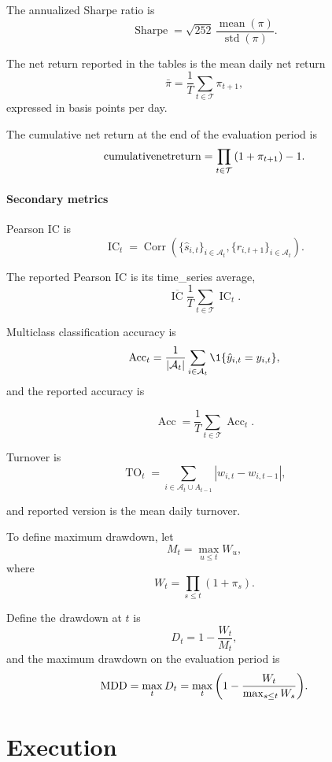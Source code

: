 \documentclass[11pt]{article}
\begin{document}
The annualized Sharpe ratio is
\[
    \operatorname{Sharpe}
    =
    \sqrt{252}\,
    \frac{\operatorname{mean}(\pi)}{\operatorname{std}(\pi)}.
\]

The net return reported in the tables is the mean daily net return \[\bar \pi = \frac1T \sum_{t\in \mathcal T} \pi_{t+1},\] expressed in basis points per day.

The cumulative net return at the end of the evaluation period is \[\mathrm{cumulative net return} = \prod_{t\in \mathcal T} {\left\lparen1+\pi_{t+1}\right\rparen} -1.\]

\paragraph{Secondary metrics}
Pearson IC is
\[
    \operatorname{IC}_t
    =
    \operatorname{Corr}
    \left(
        \{\hat{s}_{i,t}\}_{i \in \mathcal A_t},
        \{r_{i,t+1}\}_{i \in \mathcal A_t}
    \right).
\]

The reported Pearson IC is its time\_series average, \[\overline{\operatorname{IC}} \frac1T\sum_{t\in \mathcal T} \operatorname{IC}_t.\]

Multiclass classification accuracy is \[\operatorname{Acc}_t = \frac{1}{|\mathcal A_t|} \sum_{i\in \mathcal A_t} \1 \st{\hat y_{i,t} =y_{i,t}},\] and the reported accuracy is 

\[\operatorname{Acc} = \frac1T\sum_{t\in \mathcal T} \operatorname{Acc}_t.\]

Turnover is
\[
    \operatorname{TO}_t
    =
    \sum_{i \in \mathcal A_t\cup A_{t-1}} |w_{i,t} - w_{i,t-1}|,
\]

and reported version is the mean daily turnover.

To define maximum drawdown, let \[M_t = \max_{u\le t} W_u,\] where \[W_t = \prod_{s\le t}(1+\pi_{s}).\]

Define the drawdown at $t$ is \[D_t = 1- \frac{W_t}{M_t},\] and the maximum drawdown on the evaluation period is \[\operatorname{MDD} = \max_t D_t = \max_t{\left\lparen1- \frac{W_t}{\max_{s\le t}W_s}\right\rparen}.\]



\section{Execution}
\end{document}
